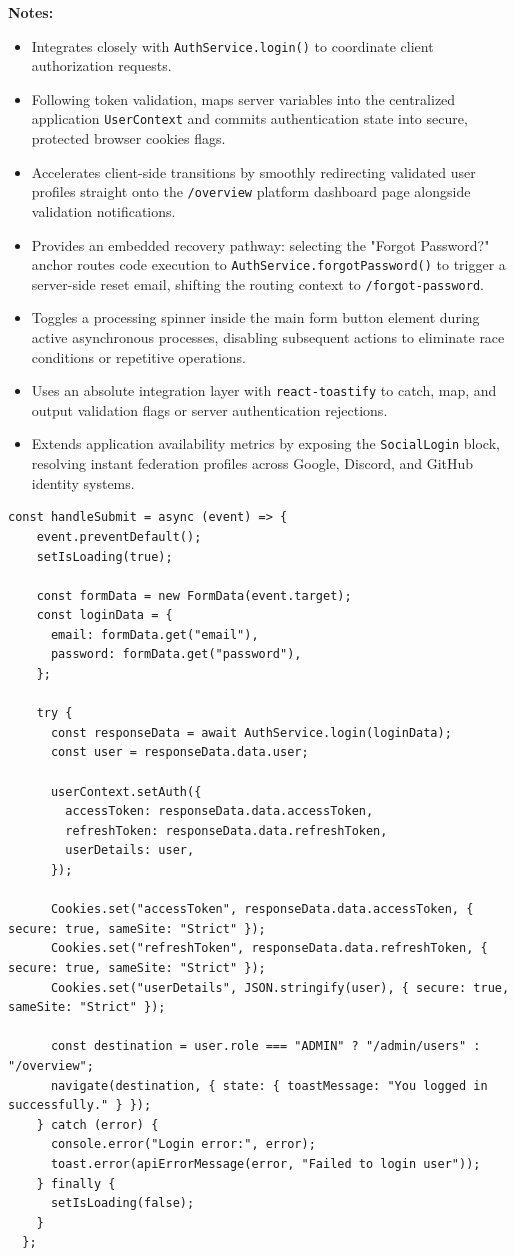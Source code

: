 \vspace{0.2cm}
\noindent\textbf{Notes:}
\begin{itemize}
    \item Integrates closely with \texttt{AuthService.login()} to coordinate client authorization requests.
    \item Following token validation, maps server variables into the centralized application \texttt{UserContext} and commits authentication state into secure, protected browser cookies flags.
    \item Accelerates client-side transitions by smoothly redirecting validated user profiles straight onto the \texttt{/overview} platform dashboard page alongside validation notifications.
    \item Provides an embedded recovery pathway: selecting the "Forgot Password?" anchor routes code execution to \texttt{AuthService.forgotPassword()} to trigger a server-side reset email, shifting the routing context to \texttt{/forgot-password}.
    \item Toggles a processing spinner inside the main form button element during active asynchronous processes, disabling subsequent actions to eliminate race conditions or repetitive operations.
    \item Uses an absolute integration layer with \texttt{react-toastify} to catch, map, and output validation flags or server authentication rejections.
    \item Extends application availability metrics by exposing the \texttt{SocialLogin} block, resolving instant federation profiles across Google, Discord, and GitHub identity systems.
\end{itemize}

\begin{lstlisting}
const handleSubmit = async (event) => {
    event.preventDefault();
    setIsLoading(true);

    const formData = new FormData(event.target);
    const loginData = {
      email: formData.get("email"),
      password: formData.get("password"),
    };

    try {
      const responseData = await AuthService.login(loginData);
      const user = responseData.data.user;

      userContext.setAuth({
        accessToken: responseData.data.accessToken,
        refreshToken: responseData.data.refreshToken,
        userDetails: user,
      });

      Cookies.set("accessToken", responseData.data.accessToken, { secure: true, sameSite: "Strict" });
      Cookies.set("refreshToken", responseData.data.refreshToken, { secure: true, sameSite: "Strict" });
      Cookies.set("userDetails", JSON.stringify(user), { secure: true, sameSite: "Strict" });

      const destination = user.role === "ADMIN" ? "/admin/users" : "/overview";
      navigate(destination, { state: { toastMessage: "You logged in successfully." } });
    } catch (error) {
      console.error("Login error:", error);
      toast.error(apiErrorMessage(error, "Failed to login user"));
    } finally {
      setIsLoading(false);
    }
  };
\end{lstlisting}


